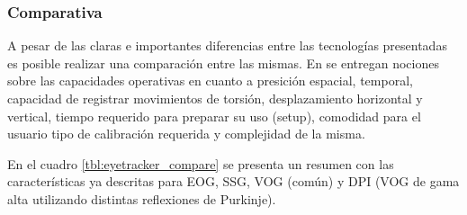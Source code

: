 \documentclass[../main.tex]{subfiles}
\begin{document}
			\subsubsection{Comparativa}
			\label{ssub:02_comparativa_eyetracker}

				A pesar de las claras e importantes diferencias entre las tecnologías presentadas es posible realizar una comparación entre las mismas. En \cite{article:eyetracker_eggert, article:eyetracker_richardson, dissertation:eyetrackers} se entregan nociones sobre las capacidades operativas en cuanto a presición espacial, temporal, capacidad de registrar movimientos de torsión, desplazamiento horizontal y vertical, tiempo requerido para preparar su uso (setup), comodidad para el usuario tipo de calibración requerida y complejidad de la misma. 

				En el cuadro \ref{tbl:eyetracker_compare} se presenta un resumen con las características ya descritas para EOG, SSG, VOG (común) y DPI (VOG de gama alta utilizando distintas reflexiones de Purkinje). 
				
\end{document}
